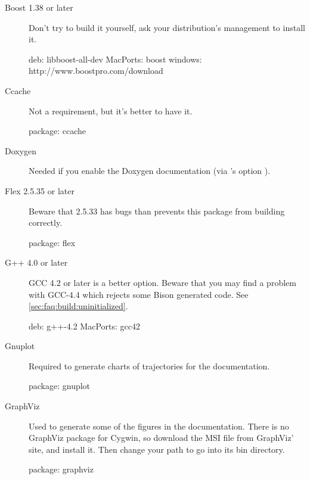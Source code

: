 \begin{description}
\item[Boost 1.38 or later] Don't try to build it yourself, ask your
  distribution's management to install it.
\begin{package}
deb: libboost-all-dev
MacPorts: boost
windows: http://www.boostpro.com/download
\end{package}

\item[Ccache]
  Not a requirement, but it's better to have it.
\begin{package}
package: ccache
\end{package}

\item[Doxygen] Needed if you enable the Doxygen documentation (via
  's option ).

\item[Flex 2.5.35 or later]
  Beware that 2.5.33 has bugs than prevents this package from building
  correctly.
\begin{package}
package: flex
\end{package}

\item[G++ 4.0 or later] GCC 4.2 or later is a better option.  Beware that
  you may find a problem with GCC-4.4 which rejects some Bison generated
  code.  See \autoref{sec:faq:build:uninitialized}.
\begin{package}
deb: g++-4.2
MacPorts: gcc42
\end{package}

\item[Gnuplot]
  Required to generate charts of trajectories for the documentation.
\begin{package}
package: gnuplot
\end{package}

\item[GraphViz] Used to generate some of the figures in the
  documentation.  There is no GraphViz package for Cygwin, so download
  the MSI file from GraphViz' site, and install it.  Then change your
  path to go into its bin directory.


\begin{package}
package: graphviz
\end{package}


\end{description}
